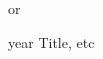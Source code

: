 \documentclass{WileySix}
\begin{document}

\booktitle{}
\subtitle{}

\author{}
or
\authors{}


\halftitlepage
\titlepage






\begin{copyrightpage}{year}
Title, etc
\end{copyrightpage}

% 




\dedication{}
\end{document}
